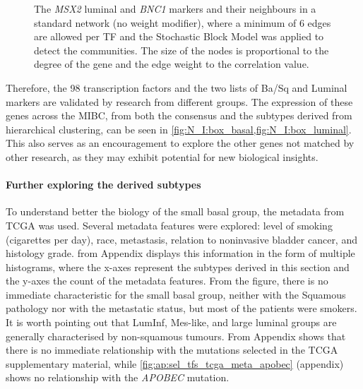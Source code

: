 \begin{figure}[H]
    \caption{The \textit{MSX2} luminal and \textit{BNC1} markers and their neighbours in a standard network (no weight modifier), where a minimum of 6 edges are allowed per TF and the Stochastic Block Model was applied to detect the communities. The size of the nodes is proportional to the degree of the gene and the edge weight to the correlation value.}
    
    \label{fig:N_I:net_neighbours}
\end{figure}


Therefore, the 98 transcription factors and the two lists of Ba/Sq and Luminal markers are validated by research from different groups. The expression of these genes across the MIBC, from both the consensus and the subtypes derived from hierarchical clustering, can be seen in \cref{fig:N_I:box_basal,fig:N_I:box_luminal}. This also serves as an encouragement to explore the other genes not matched by other research, as they may exhibit potential for new biological insights.

\paragraph*{Further exploring the derived subtypes} \label{s:N_I:sel_tfs_subtypes}

To understand better the biology of the small basal group, the metadata from TCGA \citet{Robertson2017-mg} was used. Several metadata features were explored: level of smoking (cigarettes per day), race, metastasis, relation to noninvasive bladder cancer, and histology grade.  from Appendix displays this information in the form of multiple histograms, where the x-axes represent the subtypes derived in this section and the y-axes the count of the metadata features. From the figure, there is no immediate characteristic for the small basal group, neither with the Squamous pathology nor with the metastatic status, but most of the patients were smokers. It is worth pointing out that LumInf, Mes-like, and large luminal groups are generally characterised by non-squamous tumours. From Appendix  shows that there is no immediate relationship with the mutations selected in the TCGA supplementary material, while \cref{fig:ap:sel_tfs_tcga_meta_apobec} (appendix) shows no relationship with the \textit{APOBEC} mutation.

